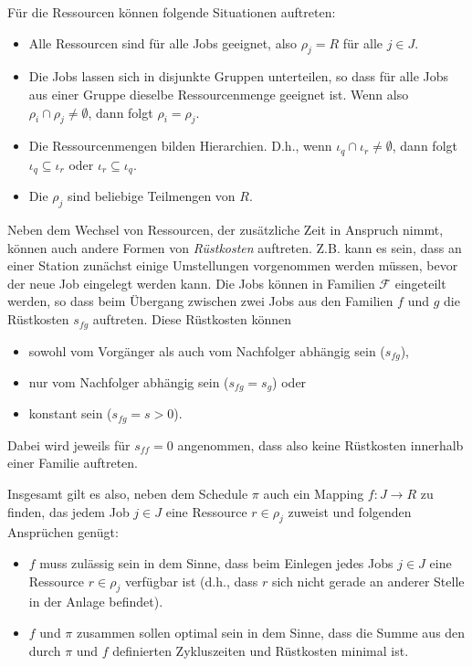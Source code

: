 \documentclass{article}
\begin{document}
Für die Ressourcen können folgende Situationen auftreten:
\begin{itemize}
    \item Alle Ressourcen sind für alle Jobs geeignet, also $\rho_j=R$ für alle $j\in J$.
    \item Die Jobs lassen sich in disjunkte Gruppen unterteilen, so dass für alle Jobs aus einer Gruppe dieselbe Ressourcenmenge geeignet ist.
        Wenn also $\rho_i \cap \rho_j \neq \emptyset$, dann folgt $\rho_i=\rho_j$.
    \item Die Ressourcenmengen bilden Hierarchien. 
        D.h., wenn $\iota_q \cap \iota_r \neq \emptyset$, dann folgt $\iota_q \subseteq \iota_r$ oder $\iota_r \subseteq \iota_q$.
    \item Die $\rho_j$ sind beliebige Teilmengen von $R$.
\end{itemize}%
Neben dem Wechsel von Ressourcen, der zusätzliche Zeit in Anspruch nimmt, können auch andere Formen von \textit{Rüstkosten}
auftreten. Z.B. kann es sein, dass an einer Station zunächst einige Umstellungen vorgenommen werden müssen, bevor der
neue Job eingelegt werden kann. Die Jobs können in Familien $\mathcal{F}$ eingeteilt werden, so dass beim Übergang
zwischen zwei Jobs aus den Familien $f$ und $g$ die Rüstkosten $s_{fg}$ auftreten.
Diese Rüstkosten können 
\begin{itemize}
    \item sowohl vom Vorgänger als auch vom Nachfolger abhängig sein ($s_{fg}$), 
    \item nur vom Nachfolger abhängig sein ($s_{fg} = s_{g}$) oder
    \item konstant sein ($s_{fg} = s > 0$).
\end{itemize}%
Dabei wird jeweils für $s_{ff} = 0$ angenommen, dass also keine Rüstkosten innerhalb einer Familie auftreten.

Insgesamt gilt es also, neben dem Schedule $\pi$ auch ein Mapping $f:J\rightarrow R$ zu finden, 
das jedem Job $j\in J$ eine Ressource $r\in\rho_j$ zuweist und folgenden Ansprüchen genügt:
\begin{itemize}
    \item $f$ muss zulässig sein in dem Sinne, dass beim Einlegen jedes Jobs $j\in J$ eine Ressource $r\in\rho_j$ verfügbar ist
        (d.h., dass $r$ sich nicht gerade an anderer Stelle in der Anlage befindet).
    \item $f$ und $\pi$ zusammen sollen optimal sein in dem Sinne, dass die Summe aus den durch $\pi$ und $f$ definierten Zykluszeiten und 
        Rüstkosten minimal ist.
\end{itemize}
\end{document}
